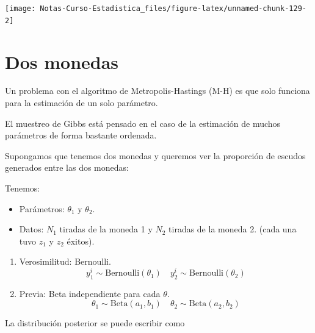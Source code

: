\documentclass[
  12pt,
]{book}
\providecommand{\tightlist}{%
  \setlength{\itemsep}{0pt}\setlength{\parskip}{0pt}}
\theoremstyle{definition}
\theoremstyle{definition}
\theoremstyle{definition}
\theoremstyle{remark}
\begin{document}
\begin{center}\texttt{[image: Notas-Curso-Estadistica\_files/figure-latex/unnamed-chunk-129-2]} \end{center}

\hypertarget{dos-monedas}{%
\section{Dos monedas}\label{dos-monedas}}

Un problema con el algoritmo de Metropolis-Hastings (M-H) es que solo funciona para la estimación de un solo parámetro.

El muestreo de Gibbs está pensado en el caso de la estimación de muchos parámetros de forma bastante ordenada.

Supongamos que tenemos dos monedas y queremos ver la proporción de escudos generados entre las dos monedas:

Tenemos:

\begin{itemize}
\tightlist
\item
  Parámetros: \(\theta_{1}\) y \(\theta_{2}\).
\item
  Datos: \(N_{1}\) tiradas de la moneda 1 y \(N_{2}\) tiradas de la moneda 2. (cada una tuvo \(z_{1}\) y \(z_{2}\) éxitos).
\end{itemize}

\begin{enumerate}
\def\labelenumi{\arabic{enumi}.}
\setcounter{enumi}{2}
\item
  Verosimilitud: Bernoulli.
  \begin{equation*}
  y_{1}^{i}\sim \mathrm{Bernoulli}(\theta_{1}) 
  \quad 
  y_{2}^{i}\sim \mathrm{Bernoulli}(\theta_{2}) 
  \end{equation*}
\item
  Previa: Beta independiente para cada \(\theta\).
  \begin{equation*}
  \theta_{1}\sim \mathrm{Beta}(a_{1},b_{1}) 
  \quad 
  \theta_{2}\sim \mathrm{Beta}(a_{2},b_{2}) 
  \end{equation*}
\end{enumerate}

La distribución posterior se puede escribir como
\end{document}
